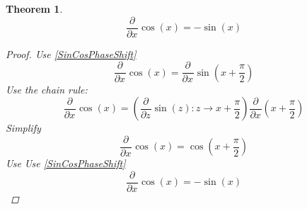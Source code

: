 \documentclass[]{article}
\newcommand{\pqty}[1]{{\left(#1\right)}}
\newcommand{\pdiff}[2]{\frac{\partial^{#2}}{\partial #1^{#2}}}
\newtheorem{theorem}{Theorem}[section]
\numberwithin{equation}{section}
\begin{document}
	\begin{theorem}
		\begin{equation}
		\pdiff{x}{}\cos\pqty{x}=-\sin\pqty{x}
		\end{equation}
		\begin{proof}
			Use \eqref{SinCosPhaseShift}
			\begin{equation}
			\pdiff{x}{}\cos\pqty{x}=\pdiff{x}{}\sin\pqty{x+\frac{\pi}{2}}
			\end{equation}
			Use the chain rule:
			\begin{equation}
			\pdiff{x}{}\cos\pqty{x}=
			\pqty{\pdiff{z}{}\sin\pqty{z}:z\to x+\frac{\pi}{2}}
			\pdiff{x}{}\pqty{x+\frac{\pi}{2}}
			\end{equation}
			Simplify
			\begin{equation}
			\pdiff{x}{}\cos\pqty{x}=
			\cos\pqty{x+\frac{\pi}{2}}
			\end{equation}
			Use 
			Use \eqref{SinCosPhaseShift}
			\begin{equation}
			\pdiff{x}{}\cos\pqty{x}=
			-\sin\pqty{x}
			\end{equation}
		\end{proof}
	\end{theorem}
\end{document}

